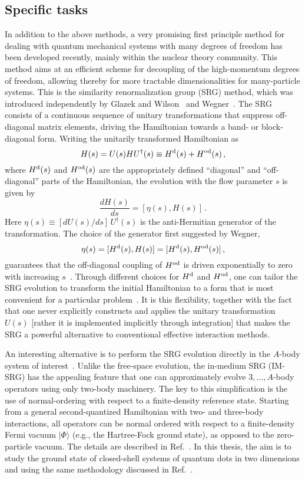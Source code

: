 \documentclass[twocolumn]{revtex4}
\begin{document}
\subsection*{Specific tasks}
In addition to the above methods, a very promising 
first principle method for dealing with quantum mechanical systems with many degrees of freedom
has been developed recently, mainly within the nuclear theory community. 
This method  aims at an efficient scheme for  decoupling of the high-momentum degrees of freedom, allowing thereby for 
more tractable dimensionalities for many-particle systems.  This is the 
similarity renormalization group (SRG) method, which was introduced
independently by Glazek and Wilson~\cite{glazek1993} and
Wegner~\cite{wegner1994}. The SRG consists of a continuous sequence of
unitary transformations that suppress off-diagonal matrix elements,
driving the Hamiltonian towards a band- or block-diagonal
form. Writing the unitarily transformed Hamiltonian as
\[
 H(s) = U(s) H U^\dagger(s) \equiv H^{\rm d}(s)+H^{\rm od}(s) \,,
\]
where $H^{\rm d}(s)$ and $H^{\rm od}(s)$ are the appropriately defined
``diagonal'' and ``off-diagonal'' parts of the Hamiltonian, the
evolution with the flow parameter $s$ is given by
\[
\frac{dH(s)}{ds} = [\eta(s),H(s)] \,.
\]
Here $\eta(s) \equiv [dU(s)/ds] \, U^{\dagger}(s)$ is the
anti-Hermitian generator of the transformation. The choice of the
generator first suggested by Wegner,
\[
 \eta(s) = [H^{\rm d}(s),H(s)] = [H^{\rm d}(s),H^{\rm od}(s)] \,,
\]
guarantees that the off-diagonal coupling of $H^{\rm od}$ is driven
exponentially to zero with increasing $s$~\cite{wegner1994}. Through
different choices for $H^{\rm d}$ and $H^{\rm od}$, one can tailor the
SRG evolution to transform the initial Hamiltonian to a form that is
most convenient for a particular problem~\cite{kehrein2006,white2002}.
It is this flexibility, together with the fact that one never
explicitly constructs and applies the unitary transformation $U(s)$
[rather it is implemented implicitly through integration] that makes the SRG a powerful
alternative to conventional effective interaction methods.

An interesting alternative is to perform the SRG evolution directly in
the $A$-body system of
interest~\cite{wegner1994,kehrein2006,white2002}. Unlike the
free-space evolution, the in-medium SRG (IM-SRG) has the appealing feature that
one can approximately evolve $3,...,A$-body operators using only
two-body machinery. The key to this simplification is the use of
normal-ordering with respect to a finite-density reference
state. Starting from a general second-quantized Hamiltonian with two-
and three-body interactions, all operators can be normal ordered with
respect to a finite-density Fermi vacuum $|\Phi\rangle$ (e.g., the
Hartree-Fock ground state), as opposed to the zero-particle
vacuum. The details are described in Ref.~\cite{srgscott}.
In this thesis, the aim is to study the ground state of closed-shell systems of
quantum dots in two dimensions and  using the same methodology discussed in
Ref.~\cite{srgscott}.
\end{document}
